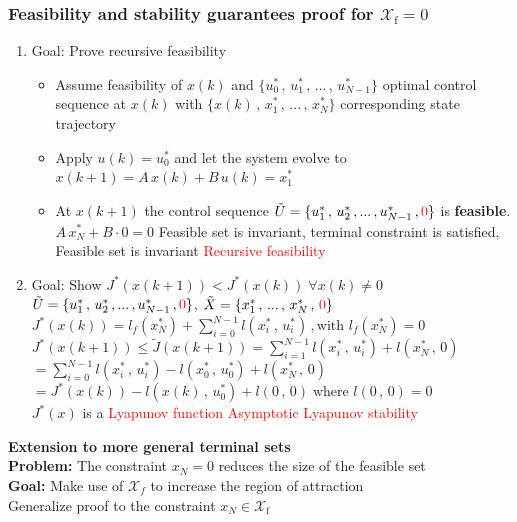 \subsubsection{Feasibility and stability guarantees proof for $\mathcal{X}_\text{f}=0$}
\begin{enumerate}
\item Goal: Prove recursive feasibility
\begin{itemize}
    \item Assume feasibility of $x(k)$ and $\{u_0^*\,,\,u_1^*\,,\,...\,,\,u_{N-1}^*\}$ optimal control sequence at $x(k)$ with $\{x(k)\,,\,x_1^*\,,\,...\,,\,x_{N}^*\}$ corresponding state trajectory
    \item Apply $u(k)=u_0^*$ and let the system evolve to $x(k+1)=A\,x(k)+B\,u(k)=x_1^*$
    \item At $x(k+1)$ the control sequence $\tilde{U}=\{u_1^*\,,\,u_2^*\,,...\,,u_{N-1}^*\,,\textcolor{red}{0}\}$ is \textbf{feasible}.\\
    $A\,x_N^*+B\cdot0=0$ \Rightarrow Feasible set is invariant, terminal constraint is satisfied, Feasible set is invariant \rightarrow \textcolor{red}{Recursive feasibility}
\end{itemize}
\item Goal: Show $J^*(x(k+1))<J^*(x(k))\;\forall x(k)\neq0$\\
$\tilde{U}=\{u_1^*\,,\,u_2^*\,,...\,,u_{N-1}^*\,,\textcolor{red}{0}\}$, $\tilde{X}=\{x_1^*\,,\,...\,,\,x_{N}^*\,,\,\textcolor{red}{0}\}$\\
$J^*(x(k))=l_f(x_N^*)+\sum_{i=0}^{N-1}l(x_i^*\,,\,u_i^*)\,,\text{with }l_f(x_N^*)=0$\\
$J^*(x(k+1))\leq\tilde{J}(x(k+1))=\sum_{i=1}^{N-1}l(x_i^*\,,\,u_i^*)+l(x_N^*\,,\,0)$\\
$=\sum_{i=0}^{N-1}l(x_i^*\,,\,u_i^*)-l(x_0^*\,,\,u_0^*)+l(x_N^*\,,\,0)$\\
$=J^*(x(k))-l(x(k)\,,\,u_0^*)+l(0\,,\,0)\;\text{where }l(0\,,\,0)=0$\\
\Rightarrow $J^*(x)$ is a \textcolor{red}{Lyapunov function} \rightarrow \textcolor{red}{Asymptotic Lyapunov stability}
\end{enumerate}
\textbf{Extension to more general terminal sets}\\
\textbf{Problem:} The constraint $x_N=0$ reduces the size of the feasible set\\
\textbf{Goal:} Make use of $\mathcal{X}_f$ to increase the region of attraction \\\rightarrow Generalize proof to the constraint $x_N\in\mathcal{X}_\text{f}$\\

